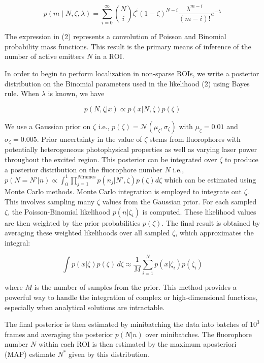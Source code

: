 \begin{equation}
p(m \mid N,\zeta,\lambda) = \sum_{i=0}^{\infty} \binom{N}{i} \zeta^i (1-\zeta)^{N-i} \frac{\lambda^{m-i}}{(m-i)!} e^{-\lambda}
\end{equation}

The expression in (2) represents a convolution of Poisson and Binomial probability mass functions. This result is the primary means of inference of the number of active emitters $N$ in a ROI.

In order to begin to perform localization in non-sparse ROIs, we write a posterior distribution on the Binomial parameters used in the likelihood (2) using Bayes rule. When $\lambda$ is known, we have

\begin{equation}
p(N,\zeta\lvert x) \propto p(x\lvert N,\zeta)p(\zeta)
\end{equation}

We use a Gaussian prior on $\zeta$ i.e., $p(\zeta) = \mathcal{N}(\mu_{\zeta},\sigma_{\zeta})$ with $\mu_{\zeta}=0.01$ and $\sigma_{\zeta}=0.005$. Prior uncertainty in the value of $\zeta$ stems from fluorophores with potentially heterogeneous photophysical properties as well as varying laser power throughout the excited region. This posterior can be integrated over $\zeta$ to produce a posterior distribution on the fluorophore number $N$ i.e., $p(N=N'\lvert n) \propto \int_{0}^{1} \prod_{j=1}^{N\mathrm{frames}} p(n_{j}\lvert N',\zeta)p(\zeta) d\zeta$ which can be estimated using Monte Carlo methods. Monte Carlo integration is employed to integrate out $\zeta$. This involves sampling many $\zeta$ values from the Gaussian prior. For each sampled $\zeta$, the Poisson-Binomial likelihood $p(n\lvert\zeta_i)$ is computed. These likelihood values are then weighted by the prior probabilities $p(\zeta)$. The final result is obtained by averaging these weighted likelihoods over all sampled $\zeta$, which approximates the integral:

\begin{equation*}
\int p(x\lvert\zeta) p(\zeta) \, d\zeta \approx \frac{1}{M} \sum_{i=1}^N p(x\lvert\zeta_i) p(\zeta_i)
\end{equation*}

where $M$ is the number of samples from the prior. This method provides a powerful way to handle the integration of complex or high-dimensional functions, especially when analytical solutions are intractable.

The final posterior is then estimated by minibatching the data into batches of $10^3$ frames and averaging the posterior $p(N\lvert n)$ over minibatches. The fluorophore number $N$ within each ROI is then estimated by the maximum aposteriori (MAP) estimate $N^{*}$ given by this distribution.

